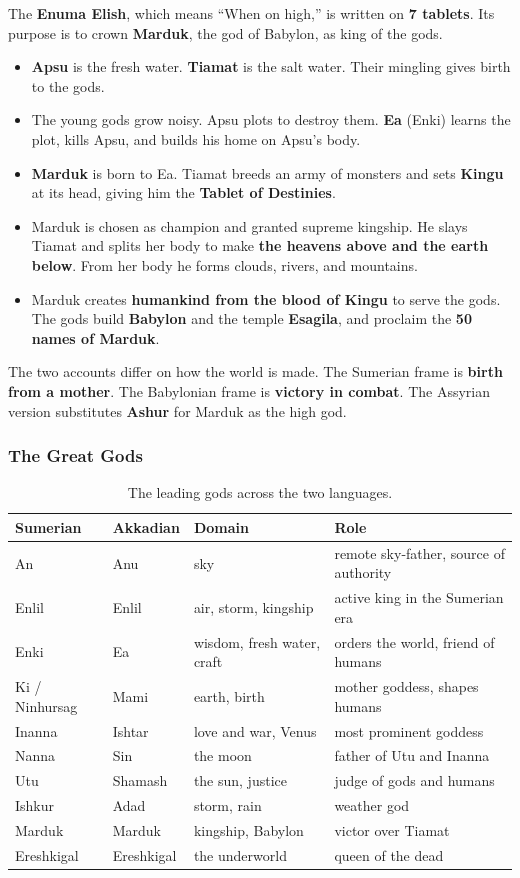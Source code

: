 The \textbf{Enuma Elish}, which means \enquote{When on high,} is written on \textbf{7 tablets}. Its purpose is to crown \textbf{Marduk}, the god of Babylon, as king of the gods.

\begin{itemize}
 \item \textbf{Apsu} is the fresh water. \textbf{Tiamat} is the salt water. Their mingling gives birth to the gods.
 \item The young gods grow noisy. Apsu plots to destroy them. \textbf{Ea} (Enki) learns the plot, kills Apsu, and builds his home on Apsu's body.
 \item \textbf{Marduk} is born to Ea. Tiamat breeds an army of monsters and sets \textbf{Kingu} at its head, giving him the \textbf{Tablet of Destinies}.
 \item Marduk is chosen as champion and granted supreme kingship. He slays Tiamat and splits her body to make \textbf{the heavens above and the earth below}. From her body he forms clouds, rivers, and mountains.
 \item Marduk creates \textbf{humankind from the blood of Kingu} to serve the gods. The gods build \textbf{Babylon} and the temple \textbf{Esagila}, and proclaim the \textbf{50 names of Marduk}.
\end{itemize}

The two accounts differ on how the world is made. The Sumerian frame is \textbf{birth from a mother}. The Babylonian frame is \textbf{victory in combat}. The Assyrian version substitutes \textbf{Ashur} for Marduk as the high god.

\subsubsection{The Great Gods}

\begin{longtable}{L{2.2cm} L{2.2cm} L{4.3cm} L{4.3cm}}
\caption{The leading gods across the two languages.}\\
\toprule
\textbf{Sumerian} & \textbf{Akkadian} & \textbf{Domain} & \textbf{Role} \\
\midrule
An & Anu & sky & remote sky-father, source of authority \\
Enlil & Enlil & air, storm, kingship & active king in the Sumerian era \\
Enki & Ea & wisdom, fresh water, craft & orders the world, friend of humans \\
Ki / Ninhursag & Mami & earth, birth & mother goddess, shapes humans \\
Inanna & Ishtar & love and war, Venus & most prominent goddess \\
Nanna & Sin & the moon & father of Utu and Inanna \\
Utu & Shamash & the sun, justice & judge of gods and humans \\
Ishkur & Adad & storm, rain & weather god \\
Marduk & Marduk & kingship, Babylon & victor over Tiamat \\
Ereshkigal & Ereshkigal & the underworld & queen of the dead \\
\bottomrule
\end{longtable}

